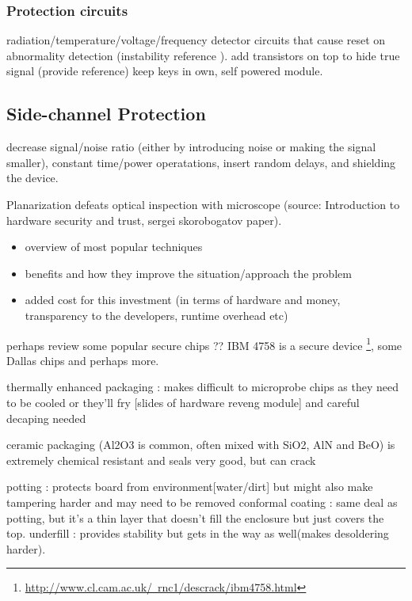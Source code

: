 \subsubsection{Protection circuits}
radiation/temperature/voltage/frequency detector circuits that cause reset on abnormality detection (instability reference \citep{anderson:cautionary_note}). add transistors on top to hide true signal (provide reference)
 keep keys in own, self powered module.
\subsection{Side-channel Protection}
decrease signal/noise ratio (either by introducing noise or making the signal smaller), constant time/power operatations, insert random delays\citep{sergei:thesis}, \citep{kocher:DPA} and shielding the device.

Planarization defeats optical inspection with microscope (source: Introduction to hardware security and trust, sergei skorobogatov paper).\\
	\begin{itemize}
	\item overview of most popular techniques \\
	\item benefits and how they improve the situation/approach the problem
	\item added cost for this investment (in terms of hardware and money, transparency to the developers, runtime overhead etc)\\
	\end{itemize}
	
	perhaps review some popular secure chips ?? IBM 4758 is a secure device \footnote{\href{http://www.cl.cam.ac.uk/~rnc1/descrack/ibm4758.html}{http://www.cl.cam.ac.uk/~rnc1/descrack/ibm4758.html}}, some Dallas chips and perhaps more.
	
	thermally enhanced packaging : makes difficult to microprobe chips as they need to be cooled or they'll fry [slides of hardware reveng module] and careful decaping needed
	
	ceramic packaging (Al2O3 is common, often mixed with SiO2, AlN and BeO) is extremely chemical resistant and seals very good, but can crack
	
	potting : protects board from environment[water/dirt] but might also make tampering harder and may need to be removed
	conformal coating : same deal as potting, but it's a thin layer that doesn't fill the enclosure but just covers the top.
	underfill : provides stability but gets in the way as well(makes desoldering harder).